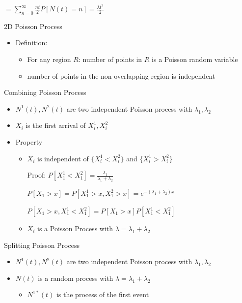 \documentclass[a4paper]{article}
\begin{document}
\begin{itemize}
\begin{itemize}
\begin{itemize}
\begin{itemize}
                                $= \sum_{n = 0}^\infty \frac{nt}{2}P[N(t) = n] = \frac{\lambda t^2}{2}$
                        \end{itemize}
                \end{itemize}
                2D Poisson Process
                \begin{itemize}
                    \item Definition:
                        \begin{itemize}
                            \item For any region $R$: number of points in $R$ is a Poisson random variable
                            \item number of points in the non-overlapping region is independent
                        \end{itemize}
                \end{itemize}
                Combining Poisson Process
                \begin{itemize}
                    \item $N^1(t), N^2(t)$ are two independent Poisson process with $\lambda_1, \lambda_2$
                    \item $X_i$ is the first arrival of $X_i^1, X_i^2$
                    \item Property
                        \begin{itemize}
                            \item $X_i$ is independent of $\{X_i^1 < X_i^2\}$ and $\{X_i^1 > X_i^2\}$ 

                                Proof: $P[X_1^1 < X_1^2] = \frac{\lambda_1}{\lambda_1 + \lambda_2}$

                                $P[X_1 > x] = P[X_1^1 > x, X_1^2 > x] = e^{-(\lambda_1 + \lambda_2)x}$

                                $P[X_1 > x, X_1^1 < X_1^2] = P[X_1 > x]P[X_1^1 < X_1^2]$
                            \item $X_i$ is a Poisson Process with $\lambda = \lambda_1 + \lambda_2$
                        \end{itemize}
                \end{itemize}
                Splitting Poisson Process
                \begin{itemize}
                    \item $N^1(t), N^2(t)$ are two independent Poisson process with $\lambda_1, \lambda_2$
                    \item $N(t)$ is a random process with $\lambda = \lambda_1 + \lambda_2$
                        \begin{itemize}
                            \item $N^{1*}(t)$ is the process of the first event


\end{itemize}
\end{itemize}
\end{itemize}
\end{itemize}
\end{document}
